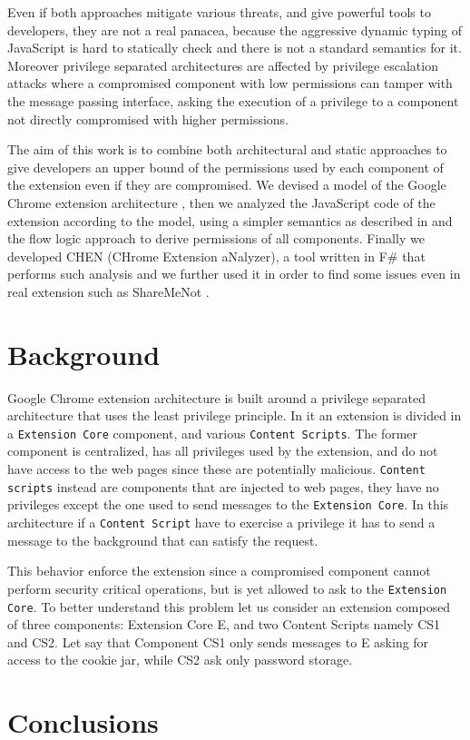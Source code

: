 \documentclass[10pt]{llncs}
\begin{document}
Even if both approaches mitigate various threats, and give powerful tools to developers, they are not a real panacea, because the aggressive dynamic typing of JavaScript is hard to statically check and there is not a standard semantics for it. Moreover privilege separated architectures are affected by privilege escalation attacks where a compromised component with low permissions can tamper with the message passing interface, asking the execution of a privilege to a component not directly compromised with higher permissions.

The aim of this work is to combine both architectural and static approaches to give developers an upper bound of the permissions used by each component of the extension even if they are compromised. We devised a model of the Google Chrome extension architecture  \cite{ChromeExtensionAPI}, then we analyzed the JavaScript code of the extension according to the model, using a simpler semantics as described in \cite{LambdaJS} and the flow logic approach to derive permissions of all components. Finally we developed CHEN (CHrome Extension aNalyzer), a tool written in F\# that performs such analysis and we further used it in order to find some issues even in real extension such as ShareMeNot \cite{ShareMeNot}.

\section{Background}
Google Chrome extension architecture is built around a privilege separated architecture that uses the least privilege principle. In it an extension is divided in a \texttt{Extension Core} component, and various \texttt{Content Scripts}. The former component is centralized, has all privileges used by the extension, and do not have access to the web pages since these are potentially malicious. \texttt{Content scripts} instead are components that are injected to web pages, they have no privileges except the one used to send messages to the \texttt{Extension Core}. In this architecture if a \texttt{Content Script} have to exercise a privilege it has to send a message to the background that can satisfy the request.

This behavior enforce the extension since a compromised component cannot perform security critical operations, but is yet allowed to ask to the \texttt{Extension Core}. To better understand this problem let us consider an extension composed of three components: Extension Core E, and two Content Scripts namely CS1 and CS2. Let say that Component CS1 only sends messages to E asking for access to the cookie jar, while CS2 ask only password storage.


\section{Conclusions}





\end{document}

